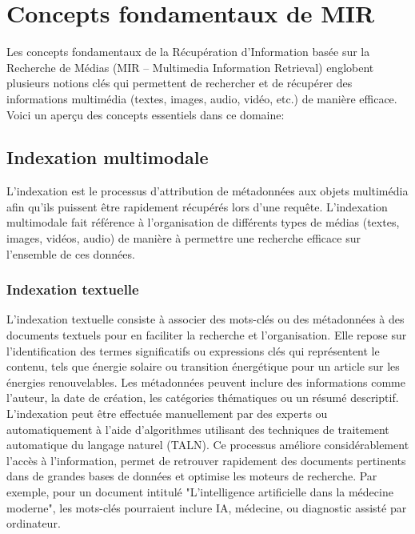 
\begin{section}

  \chapter{Concepts fondamentaux de MIR}
 Les concepts fondamentaux de la Récupération d'Information basée sur la
 Recherche de Médias (MIR -- Multimedia Information Retrieval) englobent
 plusieurs notions clés qui permettent de rechercher et de récupérer des
 informations multimédia (textes, images, audio, vidéo, etc.) de manière
 efficace. Voici un aperçu des concepts essentiels dans ce domaine:
 \setcounter{section}{1}
 \section{Indexation multimodale}

 L'indexation est le processus d'attribution de métadonnées aux objets
 multimédia afin qu'ils puissent être rapidement récupérés lors d'une requête.
 L'indexation multimodale fait référence à l'organisation de différents types de
 médias (textes, images, vidéos, audio) de manière à permettre une recherche
 efficace sur l'ensemble de ces données.

 \subsection{Indexation textuelle}
 L’indexation textuelle consiste à associer des mots-clés ou des métadonnées à
 des documents textuels pour en faciliter la recherche et l’organisation. Elle
 repose sur l’identification des termes significatifs ou expressions clés qui
 représentent le contenu, tels que énergie solaire ou transition énergétique
 pour un article sur les énergies renouvelables. Les métadonnées peuvent inclure
 des informations comme l’auteur, la date de création, les catégories
 thématiques ou un résumé descriptif. L’indexation peut être effectuée
 manuellement par des experts ou automatiquement à l’aide d’algorithmes
 utilisant des techniques de traitement automatique du langage naturel (TALN).
 Ce processus améliore considérablement l’accès à l’information, permet de
 retrouver rapidement des documents pertinents dans de grandes bases de données
 et optimise les moteurs de recherche. Par exemple, pour un document intitulé
 "L'intelligence artificielle dans la médecine moderne", les mots-clés
 pourraient inclure IA, médecine, ou diagnostic assisté par ordinateur.

\end{section}
